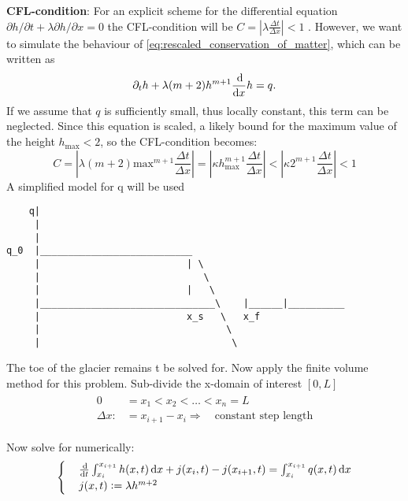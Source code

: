 \textbf{CFL-condition}:
For an explicit scheme for the differential equation $\partial h/\partial t + \lambda \partial h/ \partial x = 0$ the CFL-condition will be $C = \left | \lambda \frac{\Delta t}{\Delta x}\right| < 1$ \cite{???}.
%
However, we want to simulate the behaviour of \eqref{eq:rescaled_conservation_of_matter}, which can be written as
%
\begin{equation}
    \partial_th+\lambda (m+2)h^{m+1} \frac{\dif}{\dif{x}}h = q.
\end{equation}
%
If we assume that $q$ is sufficiently small, thus locally constant, this term can be neglected. Since this equation is scaled, a likely bound for the maximum value of the height $h_{\text{max}} < 2$, so the CFL-condition becomes:
\begin{equation*}
    C = \left | \lambda (m+2) \text{max}^{m+1} \frac{\Delta t}{\Delta x}\right| =\left | \kappa h_{\text{max}}^{m+1} \frac{\Delta t}{\Delta x}\right| < \left | \kappa 2^{m+1} \frac{\Delta t}{\Delta x}\right| < 1
\end{equation*}
A simplified model for q will be used

\begin{verbatim}
    q|
     |
     |
q_0  |___________________________
     |                          | \
     |                             \
     |                          |   \
     |_______________________________\    |______|__________
     |                          x_s   \   x_f
     |                                 \
     |                                  \
\end{verbatim}

The toe of the glacier remains t be solved for.
%
Now apply the finite volume method for this problem. Sub-divide the x-domain of interest $[0,L]$
%
\begin{align*}
 \begin{split}
     0 &= x_1 < x_2 < \dots < x_n = L\\
     \Delta x :&= x_{i+1} -x_i \Rightarrow \quad \text{constant step length}
 \end{split}   
\end{align*}

Now solve for numerically:
\begin{equation*}
    \begin{cases}
    & \frac{\dif}{\dif{t}}\int_{x_{i}}^{x_{i+1}} h(x,t) \dif{x} + j(x_i, t) - j(x_{i+1},t) = \int_{x_{i}}^{x_{i+1}} q(x,t) \dif{x} \\
    & j(x,t) := \lambda h^{m+2}
    \end{cases}
\end{equation*}

